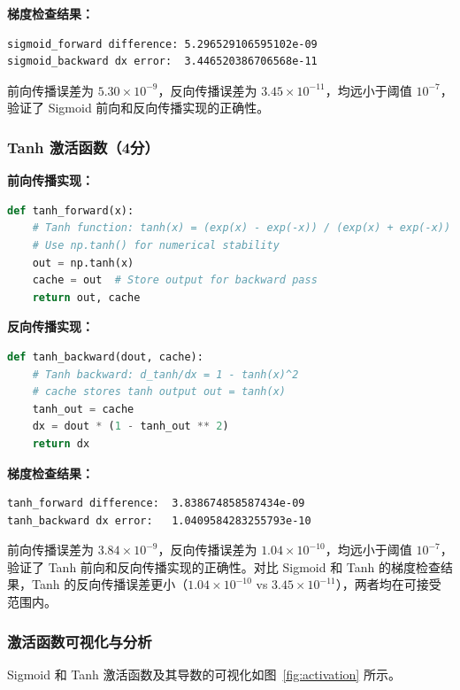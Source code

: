 \documentclass[a4paper]{article}
\begin{document}
\textbf{梯度检查结果：}

\begin{verbatim}
sigmoid_forward difference: 5.296529106595102e-09
sigmoid_backward dx error:  3.446520386706568e-11
\end{verbatim}

前向传播误差为 $5.30 \times 10^{-9}$，反向传播误差为 $3.45 \times 10^{-11}$，均远小于阈值 $10^{-7}$，验证了 Sigmoid 前向和反向传播实现的正确性。

\subsubsection{Tanh 激活函数（4分）}

\textbf{前向传播实现：}

\begin{lstlisting}[language=Python]
def tanh_forward(x):
    # Tanh function: tanh(x) = (exp(x) - exp(-x)) / (exp(x) + exp(-x))
    # Use np.tanh() for numerical stability
    out = np.tanh(x)
    cache = out  # Store output for backward pass
    return out, cache
\end{lstlisting}

\textbf{反向传播实现：}

\begin{lstlisting}[language=Python]
def tanh_backward(dout, cache):
    # Tanh backward: d_tanh/dx = 1 - tanh(x)^2
    # cache stores tanh output out = tanh(x)
    tanh_out = cache
    dx = dout * (1 - tanh_out ** 2)
    return dx
\end{lstlisting}

\textbf{梯度检查结果：}

\begin{verbatim}
tanh_forward difference:  3.838674858587434e-09
tanh_backward dx error:   1.0409584283255793e-10
\end{verbatim}

前向传播误差为 $3.84 \times 10^{-9}$，反向传播误差为 $1.04 \times 10^{-10}$，均远小于阈值 $10^{-7}$，验证了 Tanh 前向和反向传播实现的正确性。对比 Sigmoid 和 Tanh 的梯度检查结果，Tanh 的反向传播误差更小（$1.04 \times 10^{-10}$ vs $3.45 \times 10^{-11}$），两者均在可接受范围内。

\subsubsection{激活函数可视化与分析}

Sigmoid 和 Tanh 激活函数及其导数的可视化如图~\ref{fig:activation} 所示。
\end{document}
